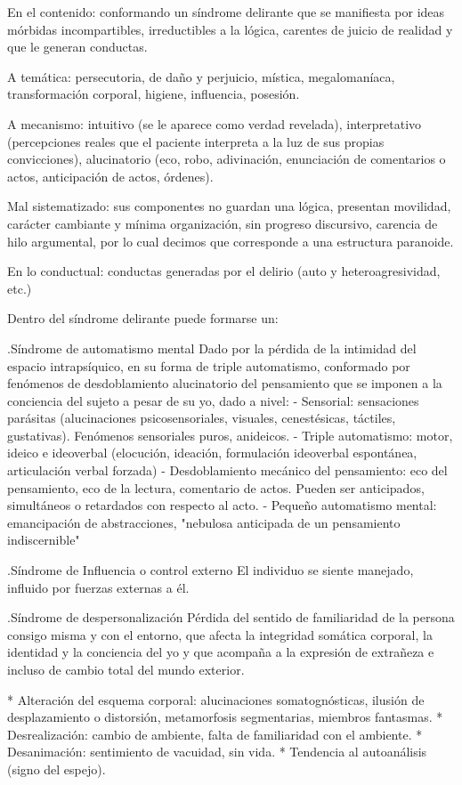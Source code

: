 \documentclass[encares.tex]{subfiles}
\begin{document}
En el contenido: conformando un síndrome delirante que se manifiesta por ideas mórbidas incompartibles, irreductibles a la lógica, carentes de juicio de realidad y que le generan conductas.

A temática: persecutoria, de daño y perjuicio, mística, megalomaníaca, transformación corporal, higiene, influencia, posesión.

A mecanismo: intuitivo (se le aparece como verdad revelada), interpretativo (percepciones reales que el paciente interpreta a la luz de sus propias convicciones), alucinatorio (eco, robo, adivinación, enunciación de comentarios o actos, anticipación de actos, órdenes).

Mal sistematizado: sus componentes no guardan una lógica, presentan movilidad, carácter cambiante y mínima organización, sin progreso discursivo, carencia de hilo argumental, por lo cual decimos que corresponde a una estructura paranoide.

En lo conductual: conductas generadas por el delirio (auto y heteroagresividad, etc.)

Dentro del síndrome delirante puede formarse un:

.Síndrome de automatismo mental
Dado por la pérdida de la intimidad del espacio intrapsíquico, en su forma de triple automatismo, conformado por fenómenos de desdoblamiento alucinatorio del pensamiento que se imponen a la conciencia del sujeto a pesar de su yo, dado a nivel:
- Sensorial: sensaciones parásitas (alucinaciones psicosensoriales, visuales, cenestésicas, táctiles, gustativas). Fenómenos sensoriales puros, anideicos.
- Triple automatismo: motor, ideico e ideoverbal (elocución, ideación, formulación ideoverbal espontánea, articulación verbal forzada)
- Desdoblamiento mecánico del pensamiento: eco del pensamiento, eco de la lectura, comentario de actos. Pueden ser anticipados, simultáneos o retardados con respecto al acto.
- Pequeño automatismo mental: emancipación de abstracciones, "nebulosa anticipada de un pensamiento indiscernible"

.Síndrome de Influencia o control externo
El individuo se siente manejado, influido por fuerzas externas a él.

.Síndrome de despersonalización
Pérdida del sentido de familiaridad de la persona consigo misma y con el entorno, que afecta la integridad somática corporal, la identidad y la conciencia del yo y que acompaña a la expresión de extrañeza e incluso de cambio total del mundo exterior.

* Alteración del esquema corporal: alucinaciones somatognósticas, ilusión de desplazamiento o distorsión, metamorfosis segmentarias, miembros fantasmas.
* Desrealización: cambio de ambiente, falta de familiaridad con el ambiente.
* Desanimación: sentimiento de vacuidad, sin vida.
* Tendencia al autoanálisis (signo del espejo).
\end{document}
